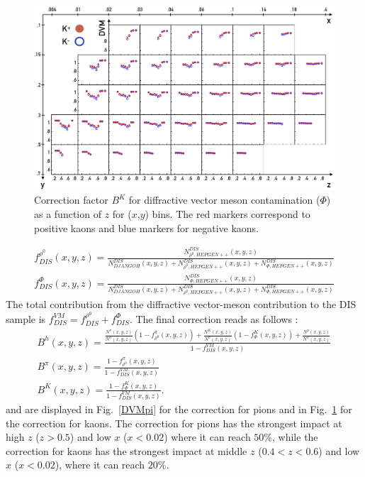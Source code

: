 \begin{figure}
  \centering
	\includegraphics[scale=0.7]{./gfx/DVMK.png}
	\caption{Correction factor $B^{K}$ for diffractive vector meson contamination ($\Phi$) as a function of $z$ for ($x$,$y$) bins. The red markers correspond to positive kaons and blue markers for negative kaons.}
	\label{DVMK}
\end{figure}
%
\begin{equation}\label{eq:DVMDIS}
  \begin{split}
    f^{\rho^0}_{DIS}(x,y,z) = \frac{N^{DIS}_{\rho^0,HEPGEN++}(x,y,z)}{N^{DIS}_{DJANGOH}(x,y,z)+N^{DIS}_{\rho^0,HEPGEN++}(x,y,z)+N^{DIS}_{\Phi,HEPGEN++}(x,y,z)} \\
    f^{\Phi}_{DIS}(x,y,z) = \frac{N^{DIS}_{\Phi,HEPGEN++}(x,y,z)}{N^{DIS}_{DJANGOH}(x,y,z)+N^{DIS}_{\rho^0,HEPGEN++}(x,y,z)+N^{DIS}_{\Phi,HEPGEN++}(x,y,z)}
  \end{split}
\end{equation}
%
The total contribution from the diffractive vector-meson contribution to the DIS sample is $f^{VM}_{DIS} = f^{\rho^0}_{DIS} + f^{\Phi}_{DIS}$. The final correction reads as follows :
%
\begin{equation}
  \begin{split}
  B^h(x,y,z) = \frac{ \frac{N^{\pi}(x,y,z)}{N^h(x,y,z)}\left (1-f^{\pi}_{\rho^0}(x,y,z)\right )
                   + \frac{N^K(x,y,z)}{N^h(x,y,z)}\left (1-f^{K}_{\Phi}(x,y,z)\right ) + \frac{N^p(x,y,z)}{N^h(x,y,z)} }{1-f^{VM}_{DIS}(x,y,z)} \\
  B^{\pi}(x,y,z) = \frac{1-f^{\pi}_{\rho^0}(x,y,z)}{1-f^{VM}_{DIS}(x,y,z)} \\
  B^K(x,y,z) = \frac{1-f^{K}_{\Phi}(x,y,z)}{1-f^{VM}_{DIS}(x,y,z)}.
  \end{split}
\end{equation}
%
and are displayed in Fig.~\ref{DVMpi} for the correction for pions and in Fig.~\ref{DVMK} for the correction for kaons. The correction for pions has the strongest impact at high $z$ ($z>0.5$) and low $x$ ($x<0.02$) where it can reach $50$\%, while the correction for kaons has the strongest impact at middle $z$ ($0.4<z<0.6$) and low $x$ ($x<0.02$), where it can reach $20$\%.

